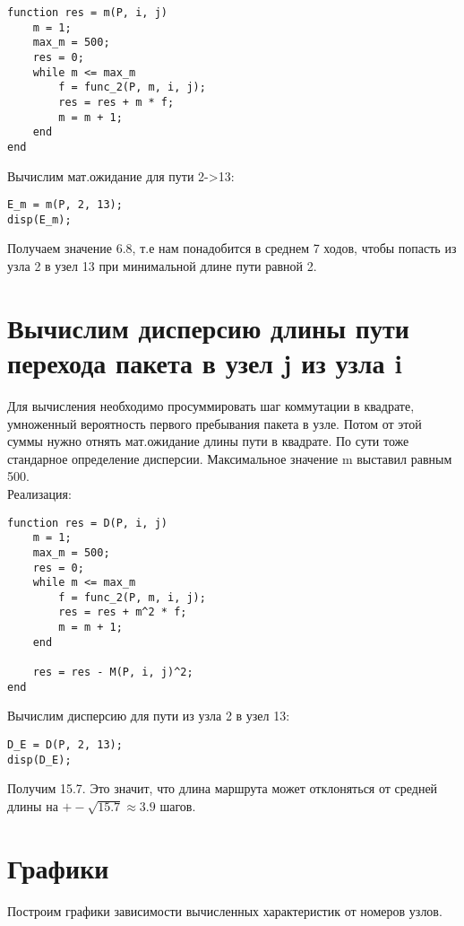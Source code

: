 \begin{lstlisting}
function res = m(P, i, j)
    m = 1;
    max_m = 500;
    res = 0;
    while m <= max_m
        f = func_2(P, m, i, j);
        res = res + m * f;
        m = m + 1;
    end
end
\end{lstlisting}

Вычислим мат.ожидание для пути 2->13:

\begin{lstlisting}
E_m = m(P, 2, 13);
disp(E_m);
\end{lstlisting}

Получаем значение 6.8, т.е нам понадобится в среднем 7 ходов, чтобы попасть из узла 2 в узел 13 при минимальной длине пути равной 2.

\section*{\textbf{Вычислим дисперсию длины пути перехода пакета в узел j из узла i}}

Для вычисления необходимо просуммировать шаг коммутации в квадрате, умноженный вероятность первого пребывания пакета в узле. Потом
от этой суммы нужно отнять мат.ожидание длины пути в квадрате. По сути тоже стандарное определение дисперсии. Максимальное значение
m выставил равным 500. \\

Реализация:

\begin{lstlisting}
function res = D(P, i, j)
    m = 1;
    max_m = 500;
    res = 0;
    while m <= max_m
        f = func_2(P, m, i, j);
        res = res + m^2 * f;
        m = m + 1;
    end

    res = res - M(P, i, j)^2;
end
\end{lstlisting}

Вычислим дисперсию для пути из узла 2 в узел 13:
\begin{lstlisting}
D_E = D(P, 2, 13);
disp(D_E);
\end{lstlisting}

Получим 15.7. Это значит, что длина маршрута может отклоняться от средней длины на $+-\sqrt{15.7} \approx 3.9$ шагов. \\

\section*{\textbf{Графики}}

Построим графики зависимости вычисленных характеристик от номеров узлов.

